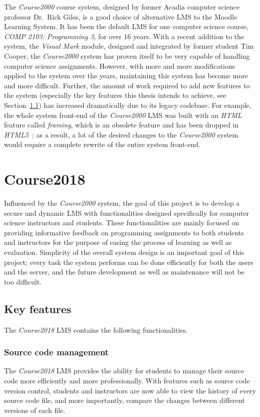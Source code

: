 The \emph{Course2000} course system, designed by former Acadia computer science
professor Dr.~Rick Giles, is a good choice
of alternative LMS to the Moodle Learning System.
It has been the
default LMS for one computer science course, \emph{COMP 2103: Programming 3},
for over 16 years.
With a recent addition to the system,
the \emph{Visual Mark} module,
designed and integrated by former student Tim Cooper,
the \emph{Course2000} system has proven itself
to be very capable of handling computer science assignments.
However, with more
and more modifications applied to the system over the years, maintaining
this system has become more and more difficult.
Further, the amount of work required to add new features to the
system (especially the key features this thesis intends to achieve,
see Section~\ref{FEATURES}) has increased dramatically
due to its legacy codebase.
For example, the whole system front-end of the \emph{Course2000} LMS was built
with an \emph{HTML} feature called \emph{framing}, which is an obsolete feature
and has been dropped in \emph{HTML5}~\cite{framing};
as a result, a lot of the desired changes to the \emph{Course2000} system would
require a complete rewrite of the entire system front-end.

\section{Course2018}
Influenced by the \emph{Course2000} system, the goal of this project is to
develop a secure and dynamic LMS with functionalities designed specifically for
computer science instructors and students.
These functionalities are mainly focused on
providing informative feedback on programming assignments to both students
and instructors for the purpose of easing the process of learning as well as
evaluation.
Simplicity of the overall system design is an important goal of this project;
every task the system 
performs can be done efficiently for both the users and the server,
and the future development as well as maintenance will not be too difficult.

\subsection{Key features}
\label{FEATURES}
The \emph{Course2018} LMS contains the following functionalities.

\subsubsection{Source code management}
The \emph{Course2018} LMS provides the ability for students to manage
their source code more efficiently and more professionally. With features such
as source code version control, students and instructors are now able
to view the history of every source code file, and more importantly, compare
the changes between different versions of each file.

